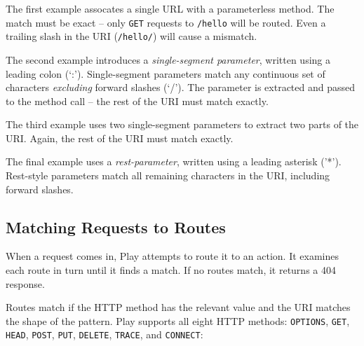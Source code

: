 \documentclass[oneside,11pt,a4paper,]{book}
\begin{document}
The first example assocates a single URL with a parameterless method.
The match must be exact -- only \texttt{GET} requests to \texttt{/hello}
will be routed. Even a trailing slash in the URI (\texttt{/hello/}) will
cause a mismatch.

The second example introduces a \emph{single-segment parameter}, written
using a leading colon (`:'). Single-segment parameters match any
continuous set of characters \emph{excluding} forward slashes (`/'). The
parameter is extracted and passed to the method call -- the rest of the
URI must match exactly.

The third example uses two single-segment parameters to extract two
parts of the URI. Again, the rest of the URI must match exactly.

The final example uses a \emph{rest-parameter}, written using a leading
asterisk ('*'). Rest-style parameters match all remaining characters in
the URI, including forward slashes.

\subsection{Matching Requests to
Routes}\label{matching-requests-to-routes}

When a request comes in, Play attempts to route it to an action. It
examines each route in turn until it finds a match. If no routes match,
it returns a 404 response.

Routes match if the HTTP method has the relevant value and the URI
matches the shape of the pattern. Play supports all eight HTTP methods:
\texttt{OPTIONS}, \texttt{GET}, \texttt{HEAD}, \texttt{POST},
\texttt{PUT}, \texttt{DELETE}, \texttt{TRACE}, and \texttt{CONNECT}:
\end{document}

